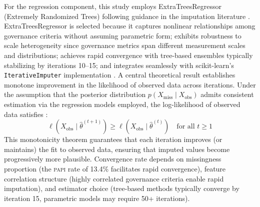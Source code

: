 \documentclass[12pt,a4paper]{article}
\newcommand{\PAPI}{\textsc{papi}\xspace}
\begin{document}
For the regression component, this study employs ExtraTreesRegressor (Extremely Randomized Trees) following guidance in the imputation literature \citep{Doove2014}. ExtraTreesRegressor is selected because it captures nonlinear relationships among governance criteria without assuming parametric form; exhibits robustness to scale heterogeneity since governance metrics span different measurement scales and distributions; achieves rapid convergence with tree-based ensembles typically stabilizing by iterations 10--15; and integrates seamlessly with scikit-learn's \texttt{IterativeImputer} implementation \citep{Pedregosa2011}. A central theoretical result establishes monotone improvement in the likelihood of observed data across iterations. Under the assumption that the posterior distribution $p(X_{\text{miss}} \mid X_{\text{obs}})$ admits consistent estimation via the regression models employed, the log-likelihood of observed data satisfies \citep{vanBuuren2011, vanBuuren2018}:
\begin{equation}
\label{eq:mice_monotone}
\ell(X_{\text{obs}} \mid \hat{\theta}^{(t+1)}) \geq \ell(X_{\text{obs}} \mid \hat{\theta}^{(t)}) \quad \text{for all } t \geq 1
\end{equation}
This monotonicity theorem guarantees that each iteration improves (or maintains) the fit to observed data, ensuring that imputed values become progressively more plausible. Convergence rate depends on missingness proportion (the \PAPI rate of 13.4\% facilitates rapid convergence), feature correlation structure (highly correlated governance criteria enable rapid imputation), and estimator choice (tree-based methods typically converge by iteration 15, parametric models may require 50+ iterations).
\end{document}
